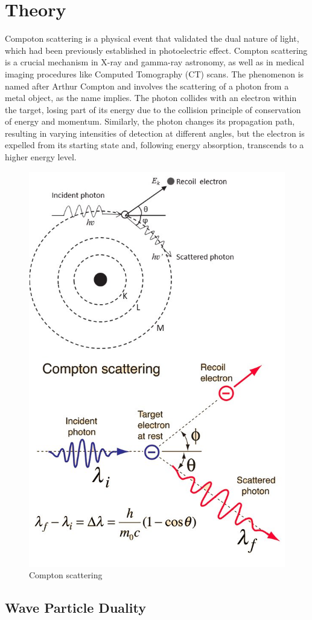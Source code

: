 \section{Theory}

	Compoton scattering is a physical event that validated the dual nature of light, which had been previously established in photoelectric effect. Compton scattering is a crucial mechanism in X-ray and gamma-ray astronomy, as well as in medical imaging procedures like Computed Tomography (CT) scans. The phenomenon is named after Arthur Compton and involves the scattering of a photon from a metal object, as the name implies. The photon collides with an electron within the target, losing part of its energy due to the collision principle of conservation of energy and momentum. Similarly, the photon changes its propagation path, resulting in varying intensities of detection at different angles, but the electron is expelled from its starting state and, following energy absorption, transcends to a higher energy level.

	\begin{figure}
		\centering
		\includegraphics[width=0.6\columnwidth]{images/t1.png}
		\caption{Compton scattering}
		\label{th:1}
	\end{figure}

	\subsection{Wave Particle Duality}

